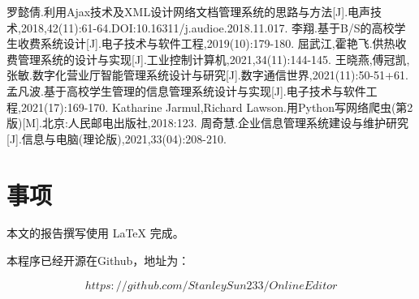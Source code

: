 \documentclass[forprint]{software}
\begin{document}
\clearpage
\cleardoublepage{}
{}
\begin{thebibliography}{99}

  罗懿倩.利用Ajax技术及XML设计网络文档管理系统的思路与方法[J].电声技术,2018,42(11):61-64.DOI:10.16311/j.audioe.2018.11.017.
  李翔.基于B/S的高校学生收费系统设计[J].电子技术与软件工程,2019(10):179-180.
  屈武江,霍艳飞.供热收费管理系统的设计与实现[J].工业控制计算机,2021,34(11):144-145.
  王晓燕,傅冠凯,张敏.数字化营业厅智能管理系统设计与研究[J].数字通信世界,2021(11):50-51+61.
  孟凡波.基于高校学生管理的信息管理系统设计与实现[J].电子技术与软件工程,2021(17):169-170.
  Katharine Jarmul,Richard Lawson.用Python写网络爬虫(第2版)[M].北京:人民邮电出版社,2018:123.
  周奇慧.企业信息管理系统建设与维护研究[J].信息与电脑(理论版),2021,33(04):208-210.
  
\end{thebibliography}

\clearpage
\appendix

\chapter{事项}

本文的报告撰写使用 LaTeX 完成。

本程序已经开源在Github，地址为：

\begin{equation*}
	https://github.com/StanleySun233/OnlineEditor
\end{equation*}
\end{document}

